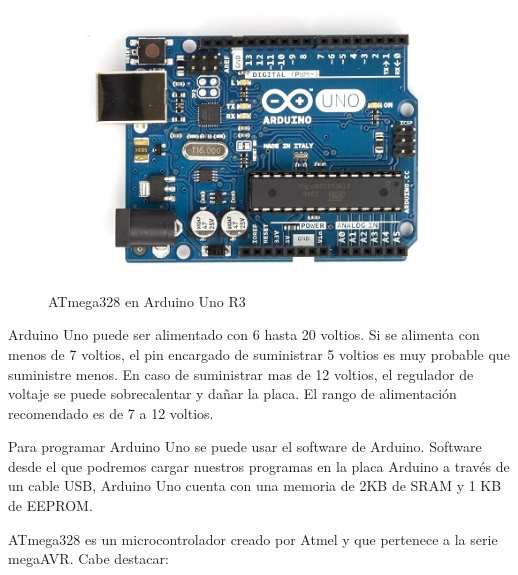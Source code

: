 				\begin{figure}[h]
					\centering
					\includegraphics{imagenes/ArduinoUno.jpg}
					\caption{ATmega328 en Arduino Uno R3}
					\label{contexto:figura}
				\end{figure}
				
				Arduino Uno puede ser alimentado con 6 hasta 20 voltios. Si se alimenta con menos de 7 voltios, el pin encargado de suministrar 5 voltios es muy probable que suministre menos. En caso de suministrar mas de 12 voltios, el regulador de voltaje se puede sobrecalentar y da\~nar la placa. El rango de alimentación recomendado es de 7 a 12 voltios.
				
				Para programar Arduino Uno se puede usar el software de Arduino. Software desde el que podremos cargar nuestros programas en la placa Arduino a través de un cable USB, Arduino Uno cuenta con una memoria de 2KB de SRAM y 1 KB de EEPROM.
				
				ATmega328 \cite{ATmega328} es un microcontrolador creado por Atmel y que pertenece a la serie megaAVR. Cabe destacar:   
				
